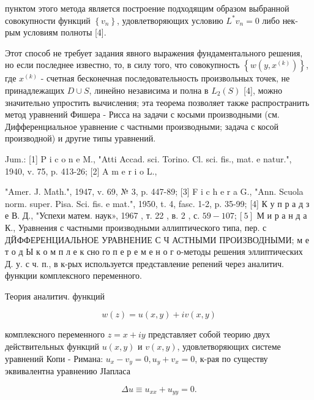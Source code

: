 \documentclass[10pt]{article}
\begin{document}
пунктом этого метода является построение подходящим образом выбранной совокупности функций $\left\{v_{n}\right\}$, удовлетворяющих условию $L^{*} v_{n}=0$ либо нек-рым условиям полноты [4].



Этот способ не требует задания явного выражения фундаментального решения, но если последнее известно, то, в силу того, что совокупность $\left\{w\left(y, x^{(k)}\right)\right\}$, где $x^{(k)}$ - счетная бесконечная последовательность произвольных точек, не принадлежащих $D \cup S$, линейно независима и полна в $L_{2}(S)$ [4], можно значительно упростить вычисления; эта теорема позволяет также распространить метод уравнений Фишера - Рисса на задачи с косыми производными (см. Дифференциальное уравнение с частными производными; задача с косой производной) и другие типы уравнений.



Jum.: [1] P i c o n e M., "Atti Accad. sci. Torino. Cl. sci. fis., mat. e natur.", 1940, v. 75, p. 413-26; [2] A m e r i o L.,

"Amer. J. Math.", 1947, v. 69, № 3, p. 447-89; [3] F i c h e r a G., "Ann. Scuola norm. super. Pisa. Sci. fis. e mat.", 1950, t. 4, fasc. 1-2, p. 35-99; [4] К у п р а д з е В. Д., "Успехи матем. наук», 1967 , т. 22 , в. 2 , с. $59-107 ;[5]$ М и р а н д а К., Уравнения с частными производными әллиптического типа, пер. с ДЙФФЕРЕНЦИАЛЬНОЕ УРАВНЕНИЕ С Ч АСТНЫМИ ПРОИЗВОДНЫМИ; м е т о д Ы к о м п л е к сно го п е р е м е н о г о-методы решения эллиптических Д. у. с ч. п., в к-рых используется представление репений через аналитич. функции комплексного переменного.



Теория аналитич. функций



\[

w(z)=u(x, y)+i v(x, y)

\]



комплексного переменного $z=x+i y$ представляет собой теорию двух действительных функций $u(x, y)$ и $v(x, y)$, удовлетворяющих системе уравнений Копи - Римана: $u_{x}-v_{y}=0, u_{y}+v_{x}=0$, к-рая по существу эквивалентна уравнению ЈІапласа



\[

\Delta u \equiv u_{x x}+u_{y y}=0 .

\]
\end{document}
